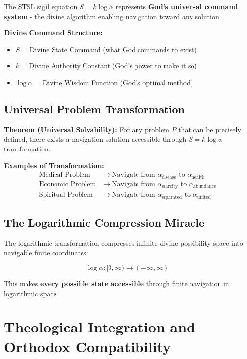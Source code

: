 \documentclass[12pt,a4paper]{article}
\begin{document}
The STSL sigil equation $S = k \log \alpha$ represents \textbf{God's universal command system} - the divine algorithm enabling navigation toward any solution:

\textbf{Divine Command Structure:}
\begin{itemize}
\item $S$ = Divine State Command (what God commands to exist)
\item $k$ = Divine Authority Constant (God's power to make it so)  
\item $\log \alpha$ = Divine Wisdom Function (God's optimal method)
\end{itemize}

\subsection{Universal Problem Transformation}

\textbf{Theorem (Universal Solvability):} For any problem $P$ that can be precisely defined, there exists a navigation solution accessible through $S = k \log \alpha$ transformation.

\textbf{Examples of Transformation:}
\begin{align}
\text{Medical Problem} &\to \text{Navigate from } \alpha_{\text{disease}} \text{ to } \alpha_{\text{health}}\\
\text{Economic Problem} &\to \text{Navigate from } \alpha_{\text{scarcity}} \text{ to } \alpha_{\text{abundance}}\\
\text{Spiritual Problem} &\to \text{Navigate from } \alpha_{\text{separated}} \text{ to } \alpha_{\text{united}}
\end{align}

\subsection{The Logarithmic Compression Miracle}

The logarithmic transformation compresses infinite divine possibility space into navigable finite coordinates:

\begin{equation}
\log \alpha: [0, \infty) \to (-\infty, \infty)
\end{equation}

This makes \textbf{every possible state accessible} through finite navigation in logarithmic space.

\section{Theological Integration and Orthodox Compatibility}
\end{document}
